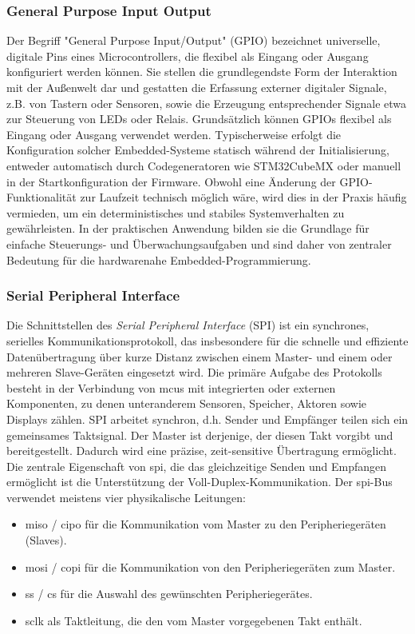 \subsubsection*{General Purpose Input Output}
Der Begriff "General Purpose Input/Output" (GPIO) bezeichnet universelle, digitale Pins eines Microcontrollers, die flexibel als Eingang oder Ausgang konfiguriert werden können.
Sie stellen die grundlegendste Form der Interaktion mit der Außenwelt dar und gestatten die Erfassung externer digitaler Signale, z.B. von Tastern oder Sensoren, sowie die Erzeugung entsprechender Signale etwa zur Steuerung von LEDs oder Relais.
Grundsätzlich können GPIOs flexibel als Eingang oder Ausgang verwendet werden.
Typischerweise erfolgt die Konfiguration solcher Embedded-Systeme statisch während der Initialisierung, entweder automatisch durch Codegeneratoren wie STM32CubeMX oder manuell in der Startkonfiguration der Firmware.
Obwohl eine Änderung der GPIO-Funktionalität zur Laufzeit technisch möglich wäre, wird dies in der Praxis häufig vermieden, um ein deterministisches und stabiles Systemverhalten zu gewährleisten.
In der praktischen Anwendung bilden sie die Grundlage für einfache Steuerungs- und Überwachungsaufgaben und sind daher von zentraler Bedeutung für die hardwarenahe Embedded-Programmierung.

\subsubsection*{Serial Peripheral Interface}
Die Schnittstellen des \emph{Serial Peripheral Interface} (SPI) ist ein synchrones, serielles Kommunikationsprotokoll, das insbesondere für die schnelle und effiziente Datenübertragung über kurze Distanz zwischen einem Master- und einem oder mehreren Slave-Geräten eingesetzt wird. 
Die primäre Aufgabe des Protokolls besteht in der Verbindung von \gls{mcu}s mit integrierten oder externen Komponenten, zu denen unteranderem  Sensoren, Speicher, Aktoren sowie Displays zählen.
SPI arbeitet synchron, d.h. Sender und Empfänger teilen sich ein gemeinsames Taktsignal.
Der Master ist derjenige, der diesen Takt vorgibt und bereitgestellt.
Dadurch wird eine präzise, zeit-sensitive Übertragung ermöglicht. 
Die zentrale Eigenschaft von \gls{spi}, die das gleichzeitige Senden und Empfangen ermöglicht ist die Unterstützung der Voll-Duplex-Kommunikation.
Der \gls{spi}-Bus verwendet meistens vier physikalische Leitungen:
\begin{itemize}
	\item \gls{miso} / \gls{cipo} für die Kommunikation vom Master zu den Peripheriegeräten (Slaves).
	\item \gls{mosi} / \gls{copi} für die Kommunikation von den Peripheriegeräten zum Master.
	\item \gls{ss} / \gls{cs} für die Auswahl des gewünschten Peripheriegerätes.
	\item \gls{sclk} als Taktleitung, die den vom Master vorgegebenen Takt enthält.
\end{itemize}

